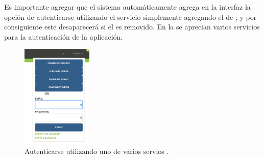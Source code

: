 Es importante agregar que el sistema automáticamente agrega en la interfaz la opción de autenticarse utilizando el servicio \thirdParty simplemente agregando el \packagesAS de \meteorNAME; y por consiguiente este desaparecerá si el \packagesAS es removido. En la  se aprecian varios servicios \thirdParty para la autenticación de la aplicación.

\begin{figure}[H]
	\centering
	\includegraphics[width=0.3\textwidth]{figuras/accounts/log_in_all_package.png}

	\caption{Autenticarse utilizando uno de varios servios \thirdParty.}
	\label{figure:account:log_in_all_package}
\end{figure}







